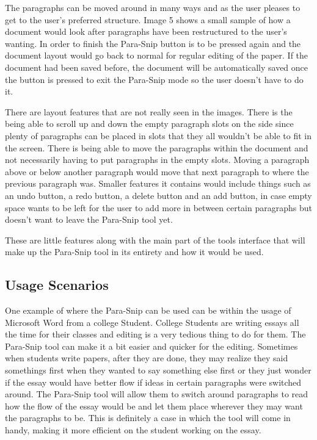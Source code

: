 \documentclass{article}
\begin{document}
	The paragraphs can be moved around in many ways and as the user pleases to get to the user's preferred structure. Image 5 shows a small sample of how a document would look after paragraphs have been restructured to the user's wanting. In order to finish the Para-Snip button is to be pressed again and the document layout would go back to normal  for regular editing of the paper. If the document had been saved before, the document will be automatically saved once the button is pressed to exit the Para-Snip mode so the user doesn't have to do it.

	There are layout features that are not really seen in the images. There is the being able to scroll up and down the empty paragraph slots on the side since plenty of paragraphs can be placed in slots that they all wouldn't be able to fit in the screen. There is being able to move the paragraphs within the document and not necessarily having to put paragraphs in the empty slots. Moving a paragraph above or below another paragraph would move that next paragraph to where the previous paragraph was. Smaller features it contains would include things such as an undo button, a redo button, a delete button and an add button, in case empty space wants to be left for the user to add more in between certain paragraphs but doesn't want to leave the Para-Snip tool yet. 

	These are little features along with the main part of the tools interface that will make up the Para-Snip tool in its entirety and how it would be used.
	
\subsection{Usage Scenarios}

	One example of where the Para-Snip can be used can be within the usage of Microsoft Word from a college Student. College Students are writing essays all the time for their classes and editing is a very tedious thing to do for them. The Para-Snip tool can make it a bit easier and quicker for the editing. Sometimes when students write papers, after they are done, they may realize they said somethings first when they wanted to say something else first or they just wonder if the essay would have better flow if ideas in certain paragraphs were switched around. The Para-Snip tool will allow them to switch around paragraphs to read how the flow of the essay would be and let them place wherever they may want the paragraphs to be. This is definitely a case in which the tool will come in handy, making it more efficient on the student working on the essay.
	
\end{document}
